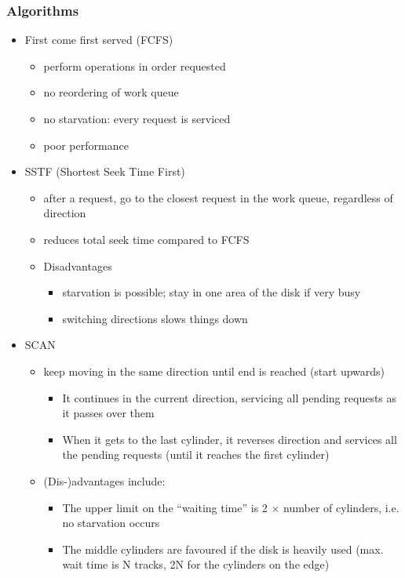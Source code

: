 \documentclass{article}
\begin{document}
\subsubsection{Algorithms}
\begin{itemize}
	\item First come first served (FCFS)
	\begin{itemize}
		\item perform operations in order requested
		\item no reordering of work queue
		\item no starvation: every request is serviced
		\item poor performance
	\end{itemize}
	\item SSTF (Shortest Seek Time First)
	\begin{itemize}
		\item after a request, go to the closest request in the work queue, regardless of direction
		\item reduces total seek time compared to FCFS
		\item Disadvantages
		\begin{itemize}
			\item starvation is possible; stay in one area of the disk if very busy
			\item switching directions slows things down
		\end{itemize}
	\end{itemize}
	\item SCAN
	\begin{itemize}
		\item keep moving in the same direction until end is reached (start upwards)
		\begin{itemize}
			\item It continues in the current direction, servicing all pending requests as it passes over them
			\item When it gets to the last cylinder, it reverses direction and services all the pending requests (until it reaches the first cylinder)
		\end{itemize}
		\item (Dis-)advantages include:
		\begin{itemize}
			\item The upper limit on the “waiting time” is 2 × number of cylinders, i.e. no starvation occurs
			\item The middle cylinders are favoured if the disk is heavily used (max. wait time is N tracks, 2N for the cylinders on the edge)

\end{itemize}
\end{itemize}
\end{itemize}
\end{document}
